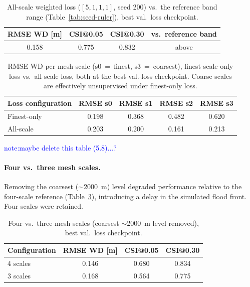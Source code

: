 \documentclass[12pt,a4paper]{report}
\begin{document}
{\begin{table}[H]
  \centering
  \caption{All-scale weighted loss ($[5,1,1,1]$, seed 200) vs.\ the reference band range
    (Table~\ref{tab:seed-ruler}), best val.\ loss checkpoint.}
  \label{tab:multiscale-loss}
  \begin{tabular}{cccc}
    \toprule
    RMSE WD [m] & CSI@0.05 & CSI@0.30 & vs.\ reference band \\
    \midrule
    0.158 & 0.775 & 0.832 & above \\
    \bottomrule
  \end{tabular}
\end{table}
 
\begin{table}[H]
  \centering
  \caption{RMSE WD per mesh scale (s0~=~finest, s3~=~coarsest), finest-scale-only loss
    vs.\ all-scale loss, both at the best-val.-loss checkpoint. Coarse scales are
    effectively unsupervised under finest-only loss.}
  \label{tab:multiscale-perscale}
  \begin{tabular}{lcccc}
    \toprule
    Loss configuration & RMSE s0 & RMSE s1 & RMSE s2 & RMSE s3 \\
    \midrule
    Finest-only   & 0.198 & 0.368 & 0.482 & 0.620 \\
    All-scale     & 0.203 & 0.200 & 0.161 & 0.213 \\
    \bottomrule
  \end{tabular}
\end{table}
\textcolor{blue}{note:maybe delete this table (5.8)...?}
 
\paragraph{Four vs.\ three mesh scales.}
Removing the coarsest ($\sim$2000~m) level degraded performance
relative to the four-scale reference (Table~\ref{tab:threescale}), introducing a delay in the simulated flood front. Four scales were retained.
 
\begin{table}[H]
  \centering
  \caption{Four vs.\ three mesh scales (coarsest $\sim$2000~m level removed), best
    val.\ loss checkpoint.}
  \label{tab:threescale}
  \begin{tabular}{lccc}
    \toprule
    Configuration & RMSE WD [m] & CSI@0.05 & CSI@0.30 \\
    \midrule
    4 scales & 0.146 & 0.680 & 0.834 \\
    3 scales & 0.168 & 0.564 & 0.775 \\
    \bottomrule
  \end{tabular}
\end{table}
 
}
\end{document}
